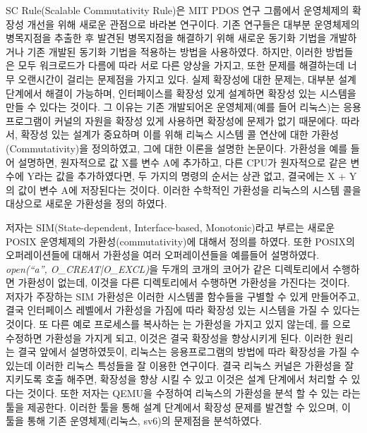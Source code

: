 SC Rule(Scalable Commutativity Rule)은 MIT PDOS 연구 그룹에서 운영체제의 확장성 개선을 위해 새로운
관점으로 바라본 연구이다.
기존 연구들은 대부분 운영체제의 병목지점을 추출한 후 발견된 병목지점을 해결하기 위해 새로운 
동기화 기법을 개발하거나 기존 개발된 동기화 기법을 적용하는 방법을 사용하였다. 
하지만, 이러한 방법들은 모두 워크로드가 다름에 따라 서로 다른 양상을 가지고, 
또한 문제를 해결하는데 너무 오랜시간이 걸리는 문제점을 가지고 있다.
실제 확장성에 대한 문제는, 대부분 설계 단계에서 해결이 가능하며, 인터페이스를 확장성 있게 설계하면 
확장성 있는 시스템을 만들 수 있다는 것이다.
그 이유는 기존 개발되어온 운영체제(예를 들어 리눅스)는 응용프로그램이 커널의 자원을 
확장성 있게 사용하면 확장성에 문제가 없기 때문에다. 
따라서, 확장성 있는 설계가 중요하며 이를 위해 리눅스 시스템 콜 연산에 대한 가환성(Commutativity)을 정의하였고, 
그에 대한 이론을 설명한 논문이다.
가환성을 예를 들어 설명하면, 원자적으로 값 X를 변수 A에 추가하고, 
다른 CPU가 원자적으로 같은 변수에 Y라는 값을 추가하였다면, 
두 가지의 명령의 순서는 상관 없고, 결국에는 X + Y의 값이 변수 A에 저장된다는 것이다.
이러한 수학적인 가환성을 리눅스의 시스템 콜을 대상으로 새로운 가환성을 정의 하였다.

저자는 SIM(State-dependent, Interface-based, Monotonic)라고 부르는 새로운
POSIX 운영체제의 가환성(commutativity)에 대해서 정의를 하였다.
또한 POSIX의 오퍼레이션들에 대해서 가환성을 여러 오퍼레이션들을 예를들어 설명하였다.
\textit{open(``a'', O\_CREAT|O\_EXCL)}을 두개의 코개의 코어가 같은 디렉토리에서 수행하면 가환성이 없는데, 
이것을 다른 디렉토리에서 수행하면 가환성을 가진다는 것이다.
저자가 주장하는 SIM 가환성은 이러한 시스템콜 함수들을 구별할 수 있게 만들어주고, 결국 
인터페이스 레벨에서 가환성을 가짐에 따라 확장성 있는 시스템을 가질 수 있다는 것이다.  
또 다른 예로 프로세스를 복사하는 는 가환성을 가지고 있지 않는데, 
를 으로 수정하면 가환성을 가지게 되고, 이것은 결국 
확장성을 향상시키게 된다. 
이러한 원리는 결국 앞에서 설명하였듯이, 리눅스는 응용프로그램의 방법에 따라 확장성을 가질 수 있는데 
이러한 리눅스 특성들을 잘 이용한 연구이다. 
결국 리눅스 커널은 가환성을 잘 지키도록 호출 해주면, 확장성을 향상 시킬 수 있고 
이것은 설계 단계에서 처리할 수 있다는 것이다.
또한 저자는 QEMU을 수정하여 리눅스의 가환성을 분석 할 수 있는 라는 툴을 제공한다. 
이러한 툴을 통해 설계 단계에서 확장성 문제를 발견할 수 있으며, 이 툴을 통해 기존 운영체제(리눅스, sv6)의 
문제점을 분석하였다. 
